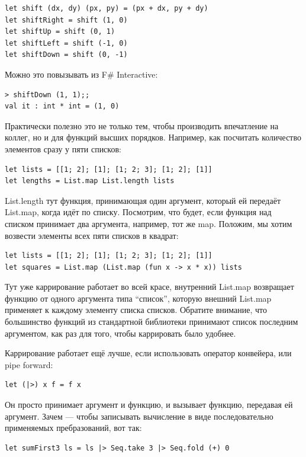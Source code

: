 \documentclass[a5paper]{article}
\begin{document}
\begin{verbatim}
let shift (dx, dy) (px, py) = (px + dx, py + dy)
let shiftRight = shift (1, 0)
let shiftUp = shift (0, 1)
let shiftLeft = shift (-1, 0)
let shiftDown = shift (0, -1)
\end{verbatim}

Можно это повызывать из F\# Interactive:

\begin{verbatim}
> shiftDown (1, 1);;
val it : int * int = (1, 0)
\end{verbatim}

Практически полезно это не только тем, чтобы производить впечатление на коллег, но и для функций высших порядков. Например, как посчитать количество элементов сразу у пяти списков:

\begin{verbatim}
let lists = [[1; 2]; [1]; [1; 2; 3]; [1; 2]; [1]]
let lengths = List.map List.length lists
\end{verbatim}

List.length тут функция, принимающая один аргумент, который ей передаёт List.map, когда идёт по списку. Посмотрим, что будет, если функция над списком принимает два аргумента, например, тот же map. Положим, мы хотим возвести элементы всех пяти списков в квадрат:

\begin{verbatim}
let lists = [[1; 2]; [1]; [1; 2; 3]; [1; 2]; [1]]
let squares = List.map (List.map (fun x -> x * x)) lists
\end{verbatim}

Тут уже каррирование работает во всей красе, внутренний List.map возвращает функцию от одного аргумента типа ``список'', которую внешний List.map применяет к каждому элементу списка списков. Обратите внимание, что большинство функций из стандартной библиотеки принимают список последним аргументом, как раз для того, чтобы каррировать было удобнее.

Каррирование работает ещё лучше, если использовать оператор конвейера, или pipe forward:

\begin{verbatim}
let (|>) x f = f x
\end{verbatim}

Он просто принимает аргумент и функцию, и вызывает функцию, передавая ей аргумент. Зачем --- чтобы записывать вычисление в виде последовательно применяемых пребразований, вот так:

\begin{verbatim}
let sumFirst3 ls = ls |> Seq.take 3 |> Seq.fold (+) 0
\end{verbatim}
\end{document}
